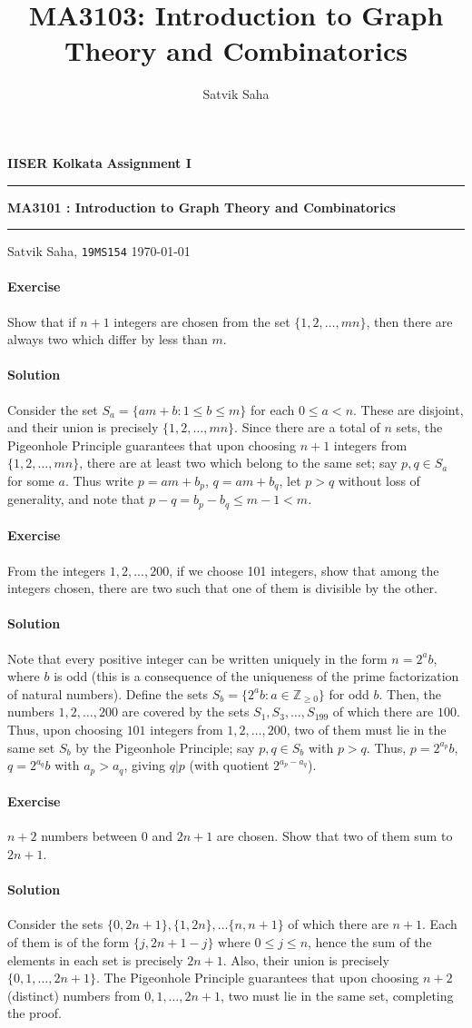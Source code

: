 \documentclass[10pt]{article}
\title{MA3103: Introduction to Graph Theory and Combinatorics}
\author{Satvik Saha}
\date{}
\newcounter{prob}
\newcommand{\problem}{\stepcounter{prob}\paragraph{Exercise \arabic{prob}}}
\newcommand{\solution}{\paragraph{Solution}}
\newcommand{\Z}{\mathbb{Z}}
\begin{document}
    \noindent\textbf{IISER Kolkata} \hfill \textbf{Assignment I}
    \vspace{3pt}
    \hrule
    \vspace{3pt}
    \begin{center}
    \LARGE{\textbf{MA3101 : Introduction to Graph Theory and Combinatorics}}
    \end{center}
    \vspace{3pt}
    \hrule
    \vspace{3pt}
    Satvik Saha, \texttt{19MS154} \hfill \today
    \vspace{20pt}

    \problem Show that if $n + 1$ integers are chosen from the set $\{1, 2, \dots,
    mn\}$, then there are always two which differ by less than $m$.

    \solution Consider the set $S_a = \{am + b: 1 \leq b \leq m\}$ for each $0 \leq a
    < n$. These are disjoint, and their union is precisely $\{1, 2, \dots, mn\}$.
    Since there are a total of $n$ sets, the Pigeonhole Principle guarantees that
    upon choosing $n + 1$ integers from $\{1, 2, \dots, mn\}$, there are at least two
    which belong to the same set; say $p, q \in S_a$ for some $a$.  Thus write $p =
    am + b_p$, $q = am + b_q$, let $p > q$ without loss of generality, and note that
    $p - q = b_p - b_q \leq m - 1 < m$.

    \problem From the integers $1, 2, ... , 200$, if we choose 101 integers, show
    that among the integers chosen, there are two such that one of them is divisible
    by the other.

    \solution Note that every positive integer can be written uniquely in the form $n
    = 2^ab$, where $b$ is odd (this is a consequence of the uniqueness of the prime
    factorization of natural numbers). Define the sets $S_b = \{2^ab : a \in \Z_{\geq
    0}\}$ for odd $b$. Then, the numbers $1, 2, \dots, 200$ are covered by the sets
    $S_1, S_3, \dots, S_{199}$ of which there are $100$. Thus, upon choosing $101$
    integers from $1, 2, \dots, 200$, two of them must lie in the same set $S_b$ by
    the Pigeonhole Principle; say $p, q \in S_b$ with $p > q$. Thus, $p = 2^{a_p}b$,
    $q = 2^{a_q}b$ with $a_p > a_q$, giving $q | p$ (with quotient $2^{a_p - a_q}$).

    \problem $n + 2$ numbers between $0$ and $2n + 1$ are chosen. Show that two of
    them sum to $2n + 1$.

    \solution Consider the sets $\{0, 2n + 1\}, \{1, 2n\}, \dots \{n, n + 1\}$ of
    which there are $n + 1$. Each of them is of the form $\{j, 2n + 1 - j\}$ where $0
    \leq j \leq n$, hence the sum of the elements in each set is precisely $2n + 1$.
    Also, their union is precisely $\{0, 1, \dots, 2n + 1\}$.  The Pigeonhole
    Principle guarantees that upon choosing $n + 2$ (distinct) numbers from $0, 1,
    \dots, 2n + 1$, two must lie in the same set, completing the proof.
\end{document}
